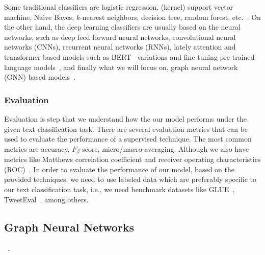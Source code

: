 Some traditional classifiers are logistic regression, (kernel) support vector machine, Naive Bayes, \(k\)-nearest neighbors, decision tree, random forest, etc.~\autocite{li20tc,kowsari19tc}. On the other hand, the deep learning classifiers are usually based on the neural networks, such as deep feed forward neural networks, convolutional neural networks (CNNs), recurrent neural networks (RNNs), lately attention and transformer based models such as BERT~\autocite{devlin18bert} variations and fine tuning pre-trained language models~\autocite{howard18tc}, and finally what we will focus on, graph neural network (GNN) based models~\autocite{kowsari19tc,li20tc,minaee20tc}.

\subsubsection{Evaluation}
Evaluation is step that we understand how the our model performs under the given text classification task. There are several evaluation metrics that can be used to evaluate the performance of a supervised technique. The most common metrics are accuracy, \(F_\beta \)-score, micro/macro-averaging. Although we also have metrics like Matthews correlation coefficient and receiver operating characteristics (ROC)~\autocite{li20tc,minaee20tc}. In order to evaluate the performance of our model, based on the provided techniques, we need to use labeled data which are preferably specific to our text classification task, i.e., we need benchmark datasets like GLUE~\autocite{wang18glue}, TweetEval~\autocite{tweeteval}, among others.

\subsection{Graph Neural Networks}\label{sec:GNN}
~\autocite{zhou20gnn,wu21gnn,zhang18dlongraphs,sun18adversarial}.